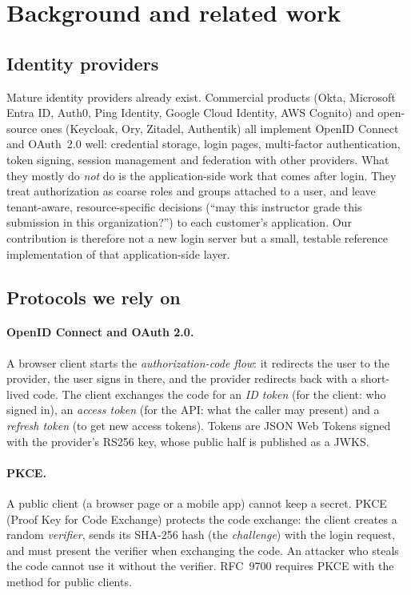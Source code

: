 \section{Background and related work}
\label{sec:background}

\subsection{Identity providers}
Mature identity providers already exist. Commercial products (Okta, Microsoft Entra ID, Auth0, Ping Identity, Google Cloud Identity, AWS Cognito) and open-source ones (Keycloak, Ory, Zitadel, Authentik) all implement OpenID Connect and OAuth~2.0 well: credential storage, login pages, multi-factor authentication, token signing, session management and federation with other providers. What they mostly do \emph{not} do is the application-side work that comes after login. They treat authorization as coarse roles and groups attached to a user, and leave tenant-aware, resource-specific decisions (``may this instructor grade this submission in this organization?'') to each customer's application. Our contribution is therefore not a new login server but a small, testable reference implementation of that application-side layer.

\subsection{Protocols we rely on}
\paragraph{OpenID Connect and OAuth 2.0.} A browser client starts the \emph{authorization-code flow}: it redirects the user to the provider, the user signs in there, and the provider redirects back with a short-lived code. The client exchanges the code for an \emph{ID token} (for the client: who signed in), an \emph{access token} (for the API: what the caller may present) and a \emph{refresh token} (to get new access tokens). Tokens are JSON Web Tokens signed with the provider's RS256 key, whose public half is published as a JWKS.

\paragraph{PKCE.} A public client (a browser page or a mobile app) cannot keep a secret. PKCE (Proof Key for Code Exchange) protects the code exchange: the client creates a random \emph{verifier}, sends its SHA-256 hash (the \emph{challenge}) with the login request, and must present the verifier when exchanging the code. An attacker who steals the code cannot use it without the verifier. RFC~9700 requires PKCE with the  method for public clients.

